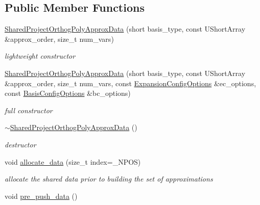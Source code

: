 \subsection*{Public Member Functions}
\begin{DoxyCompactItemize}
\item 
\hyperlink{classPecos_1_1SharedProjectOrthogPolyApproxData_a06b7db700cbae60230e0d40175c2d361}{Shared\+Project\+Orthog\+Poly\+Approx\+Data} (short basis\+\_\+type, const U\+Short\+Array \&approx\+\_\+order, size\+\_\+t num\+\_\+vars)\label{classPecos_1_1SharedProjectOrthogPolyApproxData_a06b7db700cbae60230e0d40175c2d361}

\begin{DoxyCompactList}\small\item\em lightweight constructor \end{DoxyCompactList}\item 
\hyperlink{classPecos_1_1SharedProjectOrthogPolyApproxData_a885825987a678485f495d1e267a88972}{Shared\+Project\+Orthog\+Poly\+Approx\+Data} (short basis\+\_\+type, const U\+Short\+Array \&approx\+\_\+order, size\+\_\+t num\+\_\+vars, const \hyperlink{classPecos_1_1ExpansionConfigOptions}{Expansion\+Config\+Options} \&ec\+\_\+options, const \hyperlink{classPecos_1_1BasisConfigOptions}{Basis\+Config\+Options} \&bc\+\_\+options)\label{classPecos_1_1SharedProjectOrthogPolyApproxData_a885825987a678485f495d1e267a88972}

\begin{DoxyCompactList}\small\item\em full constructor \end{DoxyCompactList}\item 
\hyperlink{classPecos_1_1SharedProjectOrthogPolyApproxData_aa048e540a2492954e43422b29d2c6e37}{$\sim$\+Shared\+Project\+Orthog\+Poly\+Approx\+Data} ()\label{classPecos_1_1SharedProjectOrthogPolyApproxData_aa048e540a2492954e43422b29d2c6e37}

\begin{DoxyCompactList}\small\item\em destructor \end{DoxyCompactList}\item 
void \hyperlink{classPecos_1_1SharedProjectOrthogPolyApproxData_af8c5dd497976d775d2c600c9950f6b2e}{allocate\+\_\+data} (size\+\_\+t index=\+\_\+\+N\+P\+OS)\label{classPecos_1_1SharedProjectOrthogPolyApproxData_af8c5dd497976d775d2c600c9950f6b2e}

\begin{DoxyCompactList}\small\item\em allocate the shared data prior to building the set of approximations \end{DoxyCompactList}\item 
void \hyperlink{classPecos_1_1SharedProjectOrthogPolyApproxData_aa93398a5eb72ec751abeb270a80998b9}{pre\+\_\+push\+\_\+data} ()\label{classPecos_1_1SharedProjectOrthogPolyApproxData_aa93398a5eb72ec751abeb270a80998b9}


\end{DoxyCompactItemize}

